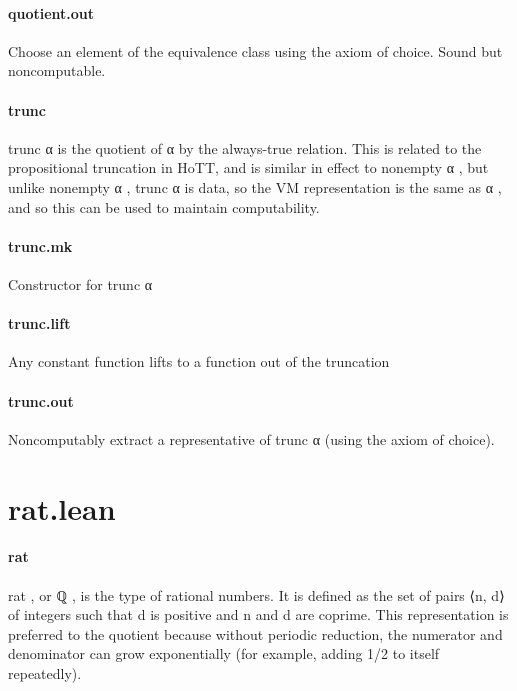 \documentclass{article}
\begin{document}
\paragraph{quotient.out}
\par
Choose an element of the equivalence class using the axiom of choice.
Sound but noncomputable.
\paragraph{trunc}
\par
\colorbox[RGB]{253,246,227}{{{{\color[RGB]{101, 123, 131} trunc α }}}} is the quotient of 
\colorbox[RGB]{253,246,227}{{{{\color[RGB]{101, 123, 131} α }}}} by the always-true relation. This
is related to the propositional truncation in HoTT, and is similar
in effect to 
\colorbox[RGB]{253,246,227}{{{{\color[RGB]{101, 123, 131} nonempty α }}}}, but unlike 
\colorbox[RGB]{253,246,227}{{{{\color[RGB]{101, 123, 131} nonempty α }}}}, 
\colorbox[RGB]{253,246,227}{{{{\color[RGB]{101, 123, 131} trunc α }}}} is data,
so the VM representation is the same as 
\colorbox[RGB]{253,246,227}{{{{\color[RGB]{101, 123, 131} α }}}}, and so this can be used to
maintain computability.
\paragraph{trunc.mk}
\par
Constructor for 
\colorbox[RGB]{253,246,227}{{{{\color[RGB]{101, 123, 131} trunc α }}}}\paragraph{trunc.lift}
\par
Any constant function lifts to a function out of the truncation
\paragraph{trunc.out}
\par
Noncomputably extract a representative of 
\colorbox[RGB]{253,246,227}{{{{\color[RGB]{101, 123, 131} trunc α }}}} (using the axiom of choice).
\section{rat.lean}\paragraph{rat}
\par
\colorbox[RGB]{253,246,227}{{{{\color[RGB]{101, 123, 131} rat }}}}, or 
\colorbox[RGB]{253,246,227}{{{{\color[RGB]{101, 123, 131} ℚ }}}}, is the type of rational numbers. It is defined
as the set of pairs ⟨n, d⟩ of integers such that 
\colorbox[RGB]{253,246,227}{{{{\color[RGB]{101, 123, 131} d }}}} is positive and 
\colorbox[RGB]{253,246,227}{{{{\color[RGB]{101, 123, 131} n }}}} and
\colorbox[RGB]{253,246,227}{{{{\color[RGB]{101, 123, 131} d }}}} are coprime. This representation is preferred to the quotient
because without periodic reduction, the numerator and denominator can grow
exponentially (for example, adding 1/2 to itself repeatedly).
\end{document}
